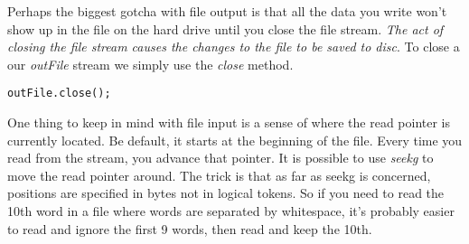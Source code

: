 \documentclass[]{tufte-handout}
\begin{document}
Perhaps the biggest gotcha with file output is that all the data you write won't show up in the file on the hard drive until you close the file stream. \textit{The act of closing the file stream causes the changes to the file to be saved to disc}.  To close a our \textit{outFile} stream we simply use the \textit{close} method.
\begin{verbatim}
outFile.close();
\end{verbatim}


One thing to keep in mind with file input is a sense of where the read pointer is currently located.  Be default, it starts at the beginning of the file.  Every time you read from the stream, you advance that pointer.  It is possible to use \textit{seekg} to move the read pointer around. The trick is that as far as seekg is concerned, positions are specified in bytes not in logical tokens.  So if you need to read the 10th word in a file where words are separated by whitespace, it's probably easier to read and ignore the first 9 words, then read and keep the 10th.
\end{document}
